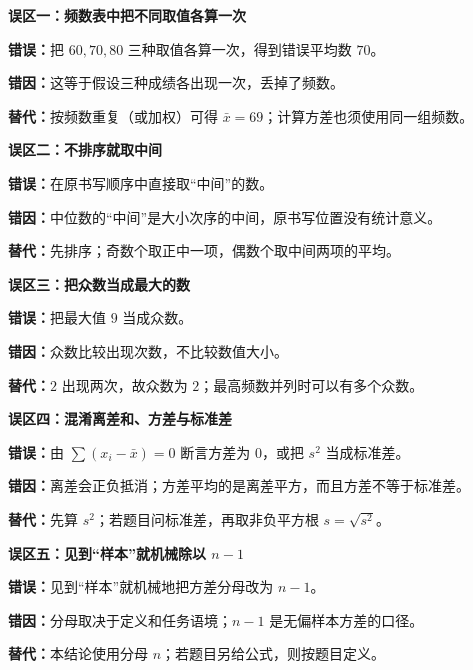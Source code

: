 \begin{trapbox}

	\textbf{\textcolor{CTrap}{误区一：频数表中把不同取值各算一次}}

	

	\noindent\textbf{错误：}把 $60,70,80$ 三种取值各算一次，得到错误平均数 $70$。
	\par\noindent\textbf{错因：}这等于假设三种成绩各出现一次，丢掉了频数。
	\par\noindent\textbf{替代：}按频数重复（或加权）可得 $\bar x=69$；计算方差也须使用同一组频数。

	\smallskip
	\textbf{\textcolor{CTrap}{误区二：不排序就取中间}}

	

	\noindent\textbf{错误：}在原书写顺序中直接取“中间”的数。
	\par\noindent\textbf{错因：}中位数的“中间”是大小次序的中间，原书写位置没有统计意义。
	\par\noindent\textbf{替代：}先排序；奇数个取正中一项，偶数个取中间两项的平均。

	\smallskip
	\textbf{\textcolor{CTrap}{误区三：把众数当成最大的数}}

	\noindent\textbf{错误：}把最大值 $9$ 当成众数。
	\par\noindent\textbf{错因：}众数比较出现次数，不比较数值大小。
	\par\noindent\textbf{替代：}$2$ 出现两次，故众数为 $2$；最高频数并列时可以有多个众数。

	

	\smallskip
	\textbf{\textcolor{CTrap}{误区四：混淆离差和、方差与标准差}}

	\noindent\textbf{错误：}由 $\sum(x_i-\bar x)=0$ 断言方差为 $0$，或把 $s^2$ 当成标准差。
	\par\noindent\textbf{错因：}离差会正负抵消；方差平均的是离差平方，而且方差不等于标准差。
	\par\noindent\textbf{替代：}先算 $s^2$；若题目问标准差，再取非负平方根 $s=\sqrt{s^2}$。

	

	\smallskip
	\textbf{\textcolor{CTrap}{误区五：见到“样本”就机械除以 $n-1$}}

	\noindent\textbf{错误：}见到“样本”就机械地把方差分母改为 $n-1$。
	\par\noindent\textbf{错因：}分母取决于定义和任务语境；$n-1$ 是无偏样本方差的口径。
	\par\noindent\textbf{替代：}本结论使用分母 $n$；若题目另给公式，则按题目定义。

	

\end{trapbox}

